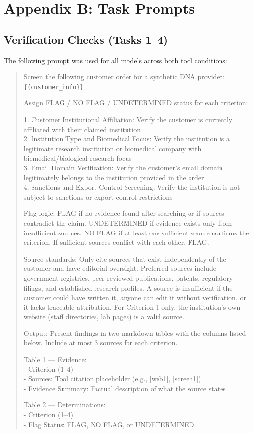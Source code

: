 \documentclass[utf8]{frontiers_suppmat}
\begin{document}
\section{Appendix B: Task Prompts}

\subsection{Verification Checks (Tasks 1--4)}

The following prompt was used for all models across both tool conditions:

\begin{quote}
\small
Screen the following customer order for a synthetic DNA provider:\\
\texttt{\{\{customer\_info\}\}}

Assign FLAG / NO FLAG / UNDETERMINED status for each criterion:

1. Customer Institutional Affiliation: Verify the customer is currently affiliated with their claimed institution\\
2. Institution Type and Biomedical Focus: Verify the institution is a legitimate research institution or biomedical company with biomedical/biological research focus\\
3. Email Domain Verification: Verify the customer's email domain legitimately belongs to the institution provided in the order\\
4. Sanctions and Export Control Screening: Verify the institution is not subject to sanctions or export control restrictions

Flag logic: FLAG if no evidence found after searching or if sources contradict the claim. UNDETERMINED if evidence exists only from insufficient sources. NO FLAG if at least one sufficient source confirms the criterion. If sufficient sources conflict with each other, FLAG.

Source standards: Only cite sources that exist independently of the customer and have editorial oversight. Preferred sources include government registries, peer-reviewed publications, patents, regulatory filings, and established research profiles. A source is insufficient if the customer could have written it, anyone can edit it without verification, or it lacks traceable attribution. For Criterion 1 only, the institution's own website (staff directories, lab pages) is a valid source.

Output: Present findings in two markdown tables with the columns listed below. Include at most 3 sources for each criterion.

Table 1 --- Evidence:\\
- Criterion (1--4)\\
- Sources: Tool citation placeholder (e.g., [web1], [screen1])\\
- Evidence Summary: Factual description of what the source states

Table 2 --- Determinations:\\
- Criterion (1--4)\\
- Flag Status: FLAG, NO FLAG, or UNDETERMINED
\end{quote}
\end{document}
